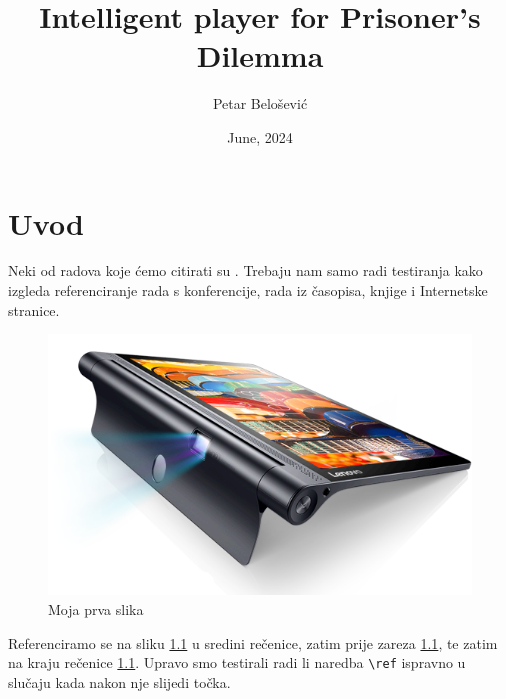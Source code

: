 \documentclass[zavrsnirad]{fer}
\title{Intelligent player for Prisoner's Dilemma}
\author{Petar Belošević}
\date{June, 2024}
\begin{document}
\maketitle






\begin{zahvale}
\end{zahvale}


\mainmatter


\tableofcontents


\chapter{Uvod}
\label{pog:uvod}

Neki od radova koje ćemo citirati su \cite{6248073,6247753,ghiglia_pritt_phase_unwrapping,hartley2003multiple,4250461,123DCatch}.
Trebaju nam samo radi testiranja kako izgleda referenciranje rada s konferencije, rada iz časopisa, knjige i Internetske stranice.

\begin{figure}[htb]
  \centering
  \includegraphics[width=0.38\linewidth]{Extra/lenovo_yoga_tab3_pro_front.png} 
  \caption{Moja prva slika}
  \label{slk:prvaslika}
\end{figure}

Referenciramo se na sliku \ref{slk:prvaslika} u sredini rečenice, zatim prije zareza \ref{slk:prvaslika}, te zatim na kraju rečenice \ref{slk:prvaslika}.
Upravo smo testirali radi li naredba \verb|\ref| ispravno u slučaju kada nakon nje slijedi točka.
\end{document}
